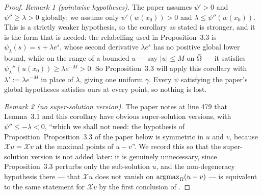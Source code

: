 \begin{proof}
\medskip\noindent\emph{Remark 1 (pointwise hypotheses).} The paper assumes
$\psi'>0$ and $\psi''\ge\lambda>0$ globally; we assume only $\psi'(w(x_0))>0$ and
$\lambda\le\psi''(w(x_0))$. This is a strictly weaker hypothesis, so the corollary as
stated is stronger, and it is the form that is needed: the relabelling used in Proposition~3.3
is $\psi_\lambda(s)=s+\lambda e^{s}$, whose second derivative $\lambda e^{s}$ has no
positive global lower bound, while on the range of a bounded $u$ --- say $|u|\le M$ on
$\bar{\Omega}$ --- it satisfies $\psi_\lambda''(u(x_0))\ge\lambda e^{-M}>0$. So Proposition~3.3 will
apply this corollary with $\lambda':=\lambda e^{-M}$ in place of $\lambda$, giving one
uniform $\gamma$. Every $\psi$ satisfying the paper's global hypotheses satisfies ours at
every point, so nothing is lost.

\medskip\noindent\emph{Remark 2 (no super-solution version).} The paper notes at line 479
that Lemma~3.1 and this corollary have obvious super-solution versions, with
$\psi''\le-\lambda<0$, ``which we shall not need: the hypothesis of
Proposition~Proposition~3.3 of the paper below is symmetric in $u$ and $v$, because
$\mathcal Xu=\mathcal Xv$ at the maximal points of $u-v$''. We record this so that the
super-solution version is not added later: it is genuinely unnecessary, since Proposition~3.3
perturbs only the sub-solution $u$, and the non-degeneracy hypothesis there --- that
$\mathcal Xu$ does not vanish on $\operatorname*{argmax}_\Omega(u-v)$ --- is equivalent to the same
statement for $\mathcal Xv$ by the first conclusion of .
\end{proof}
